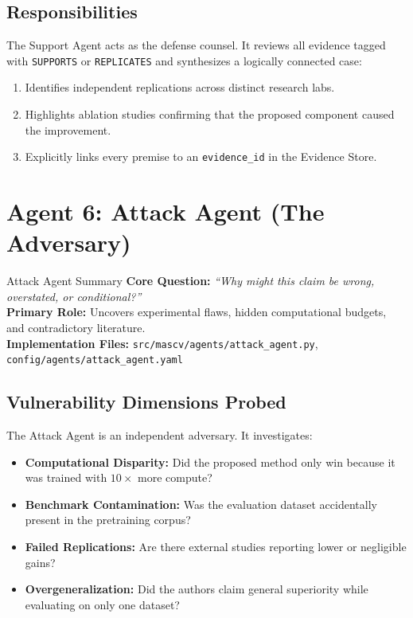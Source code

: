 \documentclass[11pt,a4paper]{article}
\begin{document}
\subsection{Responsibilities}
The Support Agent acts as the defense counsel. It reviews all evidence tagged with \texttt{SUPPORTS} or \texttt{REPLICATES} and synthesizes a logically connected case:
\begin{enumerate}
    \item Identifies independent replications across distinct research labs.
    \item Highlights ablation studies confirming that the proposed component caused the improvement.
    \item Explicitly links every premise to an \texttt{evidence\_id} in the Evidence Store.
\end{enumerate}

\section{Agent 6: Attack Agent (The Adversary)}

\begin{agentbox}{Attack Agent Summary}
\textbf{Core Question:} \textit{``Why might this claim be wrong, overstated, or conditional?''}\\
\textbf{Primary Role:} Uncovers experimental flaws, hidden computational budgets, and contradictory literature.\\
\textbf{Implementation Files:} \texttt{src/mascv/agents/attack\_agent.py}, \texttt{config/agents/attack\_agent.yaml}
\end{agentbox}

\subsection{Vulnerability Dimensions Probed}
The Attack Agent is an independent adversary. It investigates:
\begin{itemize}[leftmargin=*]
    \item \textbf{Computational Disparity:} Did the proposed method only win because it was trained with $10\times$ more compute?
    \item \textbf{Benchmark Contamination:} Was the evaluation dataset accidentally present in the pretraining corpus?
    \item \textbf{Failed Replications:} Are there external studies reporting lower or negligible gains?
    \item \textbf{Overgeneralization:} Did the authors claim general superiority while evaluating on only one dataset?
\end{itemize}
\end{document}
